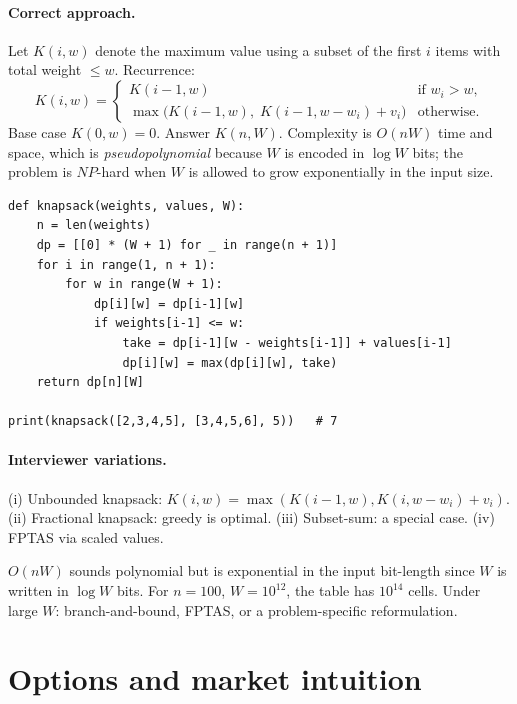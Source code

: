 \paragraph{Correct approach.}
Let $K(i, w)$ denote the maximum value using a subset of the
first $i$ items with total weight $\le w$.  Recurrence:
\[
K(i, w) =
\begin{cases}
K(i-1, w) & \text{if } w_i > w, \\
\max\bigl(K(i-1, w),\; K(i-1, w - w_i) + v_i\bigr) & \text{otherwise}.
\end{cases}
\]
Base case $K(0, w) = 0$.  Answer $K(n, W)$.  Complexity is
$O(nW)$ time and space, which is \emph{pseudopolynomial} because $W$ is
encoded in $\log W$ bits; the problem is $NP$-hard when $W$ is
allowed to grow exponentially in the input size.

\begin{lstlisting}[caption={0/1 knapsack by dynamic programming.}]
def knapsack(weights, values, W):
    n = len(weights)
    dp = [[0] * (W + 1) for _ in range(n + 1)]
    for i in range(1, n + 1):
        for w in range(W + 1):
            dp[i][w] = dp[i-1][w]
            if weights[i-1] <= w:
                take = dp[i-1][w - weights[i-1]] + values[i-1]
                dp[i][w] = max(dp[i][w], take)
    return dp[n][W]

print(knapsack([2,3,4,5], [3,4,5,6], 5))   # 7
\end{lstlisting}

\paragraph{Interviewer variations.}
(i) Unbounded knapsack: $K(i,w) = \max(K(i-1,w), K(i,w-w_i)+v_i)$.
(ii) Fractional knapsack: greedy is optimal.  (iii) Subset-sum:
a special case.  (iv) FPTAS via scaled values.

\begin{pitfallbox}[title={Pseudopolynomial is not polynomial}]
$O(nW)$ sounds polynomial but is exponential in the input
bit-length since $W$ is written in $\log W$ bits.  For $n = 100$,
$W = 10^{12}$, the table has $10^{14}$ cells.  Under large $W$:
branch-and-bound, FPTAS, or a problem-specific reformulation.
\end{pitfallbox}

\section{Options and market intuition}
\label{sec:options-problems}

